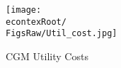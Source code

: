 \begin{figure}[]
	\centerline{\texttt{[image: \\econtexRoot/\\FigsRaw/Util\_cost.jpg]}}
	\caption{CGM Utility Costs}
	\label{fig:UtilityCosts}
\end{figure}
